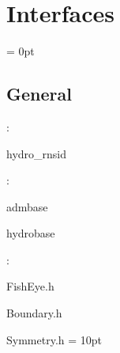 
\section{Interfaces} 


\parskip = 0pt

\vspace{3mm} \subsection*{General}

: 

hydro\_rnsid
\vspace{2mm}

: 

admbase

hydrobase
\vspace{2mm}

\vspace{5mm}

: 

FishEye.h

Boundary.h

Symmetry.h
\vspace{2mm}\parskip = 10pt 
